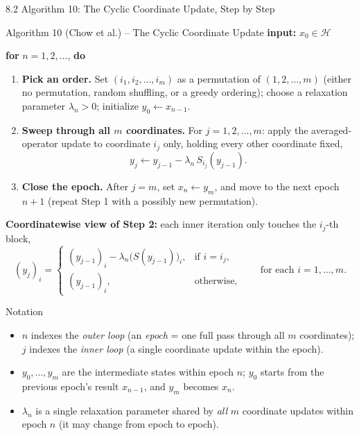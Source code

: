 \documentclass[aspectratio=169,10pt]{beamer}
\newcommand{\Hsp}{\mathcal H}
\begin{document}
\begin{frame}[allowframebreaks]{8.2 Algorithm 10: The Cyclic Coordinate Update, Step by Step}

\begin{block}{Algorithm 10 (Chow et al.) -- The Cyclic Coordinate Update}
\textbf{input:} $x_0\in\Hsp$

\textbf{for} $n=1,2,\ldots$, \textbf{do}
\begin{enumerate}
  \item \textbf{Pick an order.} Set $(i_1,i_2,\ldots,i_m)$ as a permutation of $(1,2,\ldots,m)$ (either no permutation, random shuffling, or a greedy ordering); choose a relaxation parameter $\lambda_n>0$; initialize $y_0\leftarrow x_{n-1}$.
  \item \textbf{Sweep through all $m$ coordinates.} For $j=1,2,\ldots,m$: apply the averaged-operator update to coordinate $i_j$ only, holding every other coordinate fixed,
  \[
    y_j \leftarrow y_{j-1} - \lambda_n\, S_{i_j}(y_{j-1}).
  \]
  \item \textbf{Close the epoch.} After $j=m$, set $x_n \leftarrow y_m$, and move to the next epoch $n+1$ (repeat Step 1 with a possibly new permutation).
\end{enumerate}
\end{block}

\textbf{Coordinatewise view of Step 2:} each inner iteration only touches the $i_j$-th block,
\[
  (y_j)_i = \begin{cases} (y_{j-1})_i - \lambda_n\bigl(S(y_{j-1})\bigr)_i, & \text{if } i=i_j, \\ (y_{j-1})_i, & \text{otherwise,} \end{cases} \qquad \text{for each } i=1,\ldots,m.
\]

\framebreak

\begin{block}{Notation}
\begin{itemize}
  \item $n$ indexes the \emph{outer loop} (an \emph{epoch} = one full pass through all $m$ coordinates); $j$ indexes the \emph{inner loop} (a single coordinate update within the epoch).
  \item $y_0,\ldots,y_m$ are the intermediate states within epoch $n$; $y_0$ starts from the previous epoch's result $x_{n-1}$, and $y_m$ becomes $x_n$.
  \item $\lambda_n$ is a single relaxation parameter shared by \emph{all} $m$ coordinate updates within epoch $n$ (it may change from epoch to epoch).
\end{itemize}
\end{block}


\end{frame}
\end{document}
